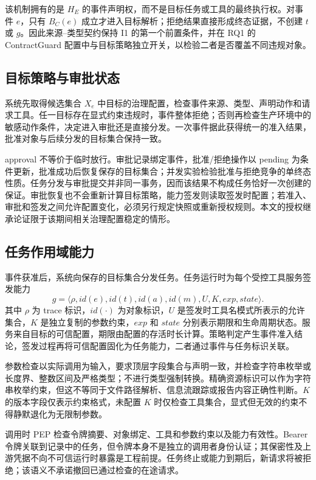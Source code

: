 该机制拥有的是 $H_E$ 的事件声明权，而不是目标任务或工具的最终执行权。对事件 $e$，只有 $B_C(e)$ 成立才进入目标解析；拒绝结果直接形成终态证据，不创建 $t$ 或 $g$。因此来源--类型契约保持 I1 的第一个前置条件，并在 RQ1 的 ContractGuard 配置中与目标策略独立开关，以检验二者是否覆盖不同违规对象。

\subsection{目标策略与审批状态}

系统先取得候选集合 $X_e$ 中目标的治理配置，检查事件来源、类型、声明动作和请求工具。任一目标存在显式约束违规时，事件整体拒绝；否则再检查生产环境中的敏感动作条件，决定进入审批还是直接分发。一次事件据此获得统一的准入结果，批准对象与后续分发的目标集合保持一致。

approval 不等价于临时放行。审批记录绑定事件，批准/拒绝操作以 pending 为条件更新，批准成功后恢复保存的目标集合；并发实验检验批准与拒绝竞争的单终态性质。任务分发与审批提交并非同一事务，因而该结果不构成任务恰好一次创建的保证。审批恢复也不会重新计算目标策略，能力签发则读取签发时配置；若准入、审批和签发之间允许配置变化，必须另行规定快照或重新授权规则。本文的授权继承论证限于该期间相关治理配置稳定的情形。

\subsection{任务作用域能力}

事件获准后，系统向保存的目标集合分发任务。任务运行时为每个受控工具服务签发能力
\begin{equation}
g=\langle \rho,id(e),id(t),id(a),id(m),U,K,exp,state\rangle .
\label{eq:grant-v11}
\end{equation}
其中 $\rho$ 为 trace 标识，$id(\cdot)$ 为对象标识，$U$ 是签发时工具名模式所表示的允许集合，$K$ 是独立复制的参数约束，$exp$ 和 $state$ 分别表示期限和生命周期状态。服务来自目标的可信配置，期限由配置的存活时长计算。策略判定产生事件准入结论，签发过程再将可信配置固化为任务能力，二者通过事件与任务标识关联。

参数检查以实际调用为输入，要求顶层字段集合与声明一致，并检查字符串枚举或长度界、整数区间及严格类型；不进行类型强制转换。精确资源标识可以作为字符串枚举约束，但这不等同于文件路径解析、信息流跟踪或报告内容正确性判断。$K$ 的版本字段仅表示约束格式，未配置 $K$ 时仅检查工具集合，显式但无效的约束不得静默退化为无限制参数。

调用时 PEP 检查令牌摘要、对象绑定、工具和参数约束以及能力有效性。Bearer 令牌关联到记录中的任务，但令牌本身不是独立的调用者身份认证；其保密性及上游凭据不向不可信运行时暴露是工程前提。任务终止或能力到期后，新请求将被拒绝；该语义不承诺撤回已通过检查的在途请求。

